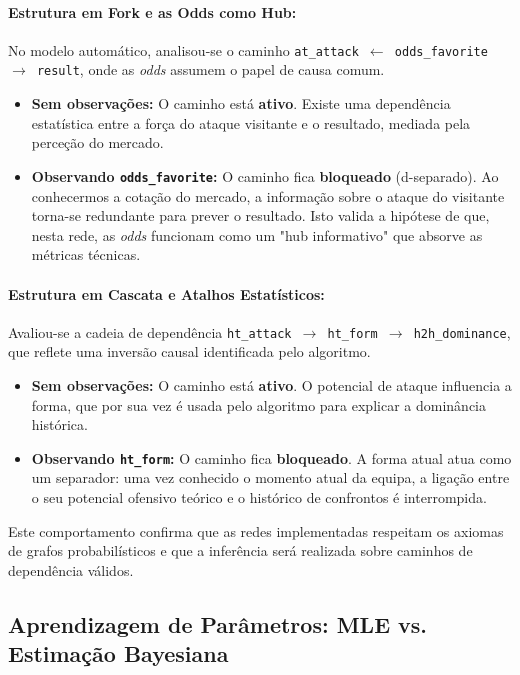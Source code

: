\documentclass[10pt]{article}
\begin{document}
\paragraph{Estrutura em Fork e as Odds como Hub:}
No modelo automático, analisou-se o caminho \texttt{at\_attack $\leftarrow$ odds\_favorite $\rightarrow$ result}, onde as \textit{odds} assumem o papel de causa comum.
\begin{itemize}
    \item \textbf{Sem observações:} O caminho está \textbf{ativo}. Existe uma dependência estatística entre a força do ataque visitante e o resultado, mediada pela perceção do mercado.
    \item \textbf{Observando \texttt{odds\_favorite}:} O caminho fica \textbf{bloqueado} (d-separado). Ao conhecermos a cotação do mercado, a informação sobre o ataque do visitante torna-se redundante para prever o resultado. Isto valida a hipótese de que, nesta rede, as \textit{odds} funcionam como um "hub informativo" que absorve as métricas técnicas.
\end{itemize}

\paragraph{Estrutura em Cascata e Atalhos Estatísticos:}
Avaliou-se a cadeia de dependência \texttt{ht\_attack $\rightarrow$ ht\_form $\rightarrow$ h2h\_dominance}, que reflete uma inversão causal identificada pelo algoritmo.
\begin{itemize}
    \item \textbf{Sem observações:} O caminho está \textbf{ativo}. O potencial de ataque influencia a forma, que por sua vez é usada pelo algoritmo para explicar a dominância histórica.
    \item \textbf{Observando \texttt{ht\_form}:} O caminho fica \textbf{bloqueado}. A forma atual atua como um separador: uma vez conhecido o momento atual da equipa, a ligação entre o seu potencial ofensivo teórico e o histórico de confrontos é interrompida.
\end{itemize}

Este comportamento confirma que as redes implementadas respeitam os axiomas de grafos probabilísticos e que a inferência será realizada sobre caminhos de dependência válidos.

\subsection{Aprendizagem de Parâmetros: MLE vs. Estimação Bayesiana}
\end{document}

